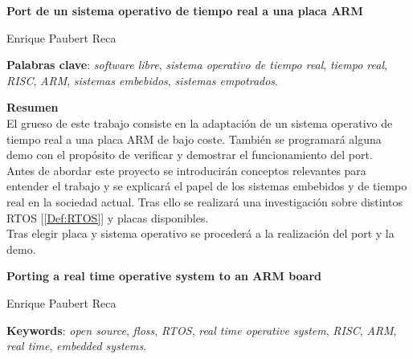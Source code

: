 \thispagestyle{empty}

\begin{center}
	{\large\bfseries Port de un sistema operativo de tiempo real a una placa ARM}\\
\end{center}
\begin{center}
	Enrique Paubert Reca\\
\end{center}

\vspace{0.7cm}

\vspace{0.5cm}
\noindent\textbf{Palabras clave}: \textit{software libre}, \textit{sistema operativo de tiempo real}, \textit{tiempo real}, \textit{RISC}, \textit{ARM}, \textit{sistemas embebidos}, \textit{sistemas empotrados}.
\vspace{0.7cm}

\noindent\textbf{Resumen}\\

El grueso de este trabajo consiste en la adaptación de un sistema operativo de tiempo real a una placa ARM de bajo coste. También se programará alguna demo con el propósito de verificar y demostrar el funcionamiento del port.\\

Antes de abordar este proyecto se introducirán conceptos relevantes para entender el trabajo y se explicará el papel de los sistemas embebidos y de tiempo real en la sociedad actual. Tras ello se realizará una investigación sobre distintos RTOS [\ref{Def:RTOS}] y placas disponibles.\\

Tras elegir placa y sistema operativo se procederá a la realización del port y la demo.\\


\cleardoublepage

\begin{center}
	{\large\bfseries Porting a real time operative system to an ARM board}\\
\end{center}
\begin{center}
	Enrique Paubert Reca\\
\end{center}
\vspace{0.7cm}
\vspace{0.5cm}
\noindent\textbf{Keywords}: \textit{open source}, \textit{floss}, \textit{RTOS}, \textit{real time operative system}, \textit{RISC}, \textit{ARM}, \textit{real time}, \textit{embedded systems}.
\vspace{0.7cm}

